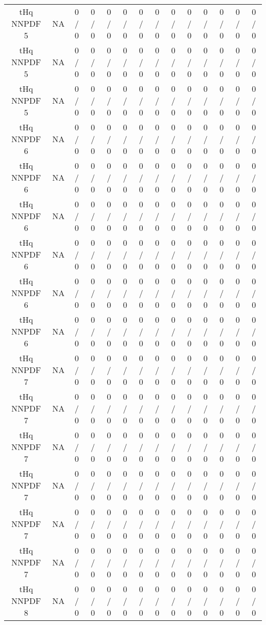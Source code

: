 \documentclass[10pt]{article}
\begin{document}
\begin{table}[htbp]
\begin{center}
\begin{tabular}{|c|c|c|c|c|c|c|c|c|c|c|c|c|c|}
  tHq NNPDF 5 &    NA    & 0 / 0 & 0 / 0 & 0 / 0 & 0 / 0 & 0 / 0 & 0 / 0 & 0 / 0 & 0 / 0 & 0 / 0 & 0 / 0 & 0 / 0 & 0 / 0 \\ 
  tHq NNPDF 5 &    NA    & 0 / 0 & 0 / 0 & 0 / 0 & 0 / 0 & 0 / 0 & 0 / 0 & 0 / 0 & 0 / 0 & 0 / 0 & 0 / 0 & 0 / 0 & 0 / 0 \\ 
  tHq NNPDF 5 &    NA    & 0 / 0 & 0 / 0 & 0 / 0 & 0 / 0 & 0 / 0 & 0 / 0 & 0 / 0 & 0 / 0 & 0 / 0 & 0 / 0 & 0 / 0 & 0 / 0 \\ 
  tHq NNPDF 6 &    NA    & 0 / 0 & 0 / 0 & 0 / 0 & 0 / 0 & 0 / 0 & 0 / 0 & 0 / 0 & 0 / 0 & 0 / 0 & 0 / 0 & 0 / 0 & 0 / 0 \\ 
  tHq NNPDF 6 &    NA    & 0 / 0 & 0 / 0 & 0 / 0 & 0 / 0 & 0 / 0 & 0 / 0 & 0 / 0 & 0 / 0 & 0 / 0 & 0 / 0 & 0 / 0 & 0 / 0 \\ 
  tHq NNPDF 6 &    NA    & 0 / 0 & 0 / 0 & 0 / 0 & 0 / 0 & 0 / 0 & 0 / 0 & 0 / 0 & 0 / 0 & 0 / 0 & 0 / 0 & 0 / 0 & 0 / 0 \\ 
  tHq NNPDF 6 &    NA    & 0 / 0 & 0 / 0 & 0 / 0 & 0 / 0 & 0 / 0 & 0 / 0 & 0 / 0 & 0 / 0 & 0 / 0 & 0 / 0 & 0 / 0 & 0 / 0 \\ 
  tHq NNPDF 6 &    NA    & 0 / 0 & 0 / 0 & 0 / 0 & 0 / 0 & 0 / 0 & 0 / 0 & 0 / 0 & 0 / 0 & 0 / 0 & 0 / 0 & 0 / 0 & 0 / 0 \\ 
  tHq NNPDF 6 &    NA    & 0 / 0 & 0 / 0 & 0 / 0 & 0 / 0 & 0 / 0 & 0 / 0 & 0 / 0 & 0 / 0 & 0 / 0 & 0 / 0 & 0 / 0 & 0 / 0 \\ 
  tHq NNPDF 7 &    NA    & 0 / 0 & 0 / 0 & 0 / 0 & 0 / 0 & 0 / 0 & 0 / 0 & 0 / 0 & 0 / 0 & 0 / 0 & 0 / 0 & 0 / 0 & 0 / 0 \\ 
  tHq NNPDF 7 &    NA    & 0 / 0 & 0 / 0 & 0 / 0 & 0 / 0 & 0 / 0 & 0 / 0 & 0 / 0 & 0 / 0 & 0 / 0 & 0 / 0 & 0 / 0 & 0 / 0 \\ 
  tHq NNPDF 7 &    NA    & 0 / 0 & 0 / 0 & 0 / 0 & 0 / 0 & 0 / 0 & 0 / 0 & 0 / 0 & 0 / 0 & 0 / 0 & 0 / 0 & 0 / 0 & 0 / 0 \\ 
  tHq NNPDF 7 &    NA    & 0 / 0 & 0 / 0 & 0 / 0 & 0 / 0 & 0 / 0 & 0 / 0 & 0 / 0 & 0 / 0 & 0 / 0 & 0 / 0 & 0 / 0 & 0 / 0 \\ 
  tHq NNPDF 7 &    NA    & 0 / 0 & 0 / 0 & 0 / 0 & 0 / 0 & 0 / 0 & 0 / 0 & 0 / 0 & 0 / 0 & 0 / 0 & 0 / 0 & 0 / 0 & 0 / 0 \\ 
  tHq NNPDF 7 &    NA    & 0 / 0 & 0 / 0 & 0 / 0 & 0 / 0 & 0 / 0 & 0 / 0 & 0 / 0 & 0 / 0 & 0 / 0 & 0 / 0 & 0 / 0 & 0 / 0 \\ 
  tHq NNPDF 8 &    NA    & 0 / 0 & 0 / 0 & 0 / 0 & 0 / 0 & 0 / 0 & 0 / 0 & 0 / 0 & 0 / 0 & 0 / 0 & 0 / 0 & 0 / 0 & 0 / 0 \\ 

\end{tabular}
\end{center}
\end{table}
\end{document}
